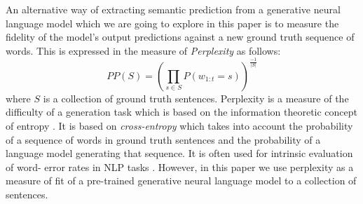 An alternative way of extracting semantic prediction from a generative neural
language model which we are going to explore in this paper is to measure the
fidelity of the model's output predictions against a new ground truth sequence
of words. This is expressed in the measure of \emph{Perplexity} as follows:
\begin{equation}\label{splu2019:eq:pp}
PP(S) =  (\prod_{s \in S}{P(w_{1:t}=s)})^{\frac{-1}{|S|}}
\end{equation}
\noindent where $S$ is a collection of ground truth sentences. Perplexity is a
measure of the difficulty of a generation task which is based on the information
theoretic concept of entropy \cite{bahl1983maximum}. It is based on
\emph{cross-entropy} which takes into account the probability of a sequence of
words in ground truth sentences and the probability of a language model
generating that sequence. It is often used for intrinsic evaluation of word-
error rates in NLP
tasks \cite{chen1998evaluation}.
However, in this paper we use perplexity as a measure of fit of a
pre-trained generative neural language model to a collection of sentences.

